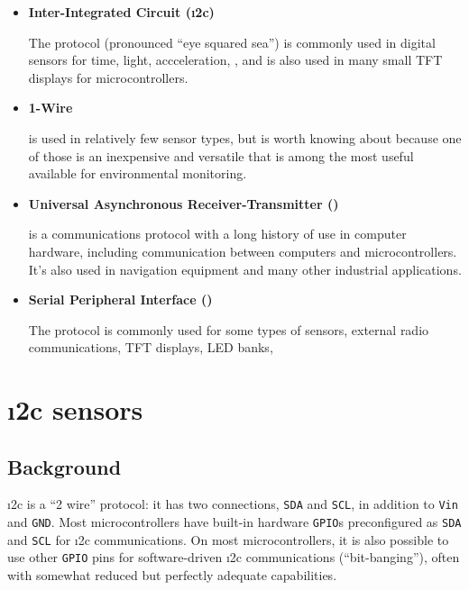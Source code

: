 \begin{itemize}
	\item \textbf{Inter-Integrated Circuit (\i2c)}
	
	The  protocol (pronounced ``eye squared sea'') is commonly used in digital sensors for time, light, accceleration, \etc, and is also used in many small TFT displays for microcontrollers.

	\item \textbf{1-Wire}	
	
	  is used in relatively few sensor types, but is worth knowing about because one of those is an inexpensive and versatile  that is among the most useful available for environmental monitoring.
	

	\item \textbf{Universal Asynchronous Receiver-Transmitter (\uart)}
	
	 is a communications protocol with a long history of use in computer hardware, including communication between computers and microcontrollers. 
	It's also used in navigation equipment and many other industrial applications.

	\item \textbf{Serial Peripheral Interface (\spi)}
	
	The  protocol is commonly used for some types of sensors, external radio communications, TFT displays, LED banks, \etc
\end{itemize}



\section{\i2c sensors}
\subsection{Background}
\i2c is a ``2 wire'' protocol: it has two connections, \texttt{SDA} and \texttt{SCL}, in addition to \texttt{Vin} and \texttt{GND}.
Most microcontrollers have built-in hardware  \texttt{GPIO}s preconfigured as \texttt{SDA} and \texttt{SCL} for \i2c communications.
On most microcontrollers, it is also possible to use other \texttt{GPIO} pins for software-driven \i2c communications (``bit-banging''), often with somewhat reduced but perfectly adequate capabilities.

